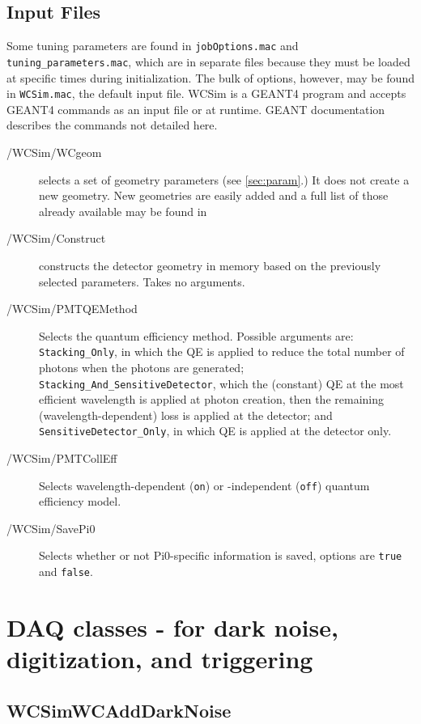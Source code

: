  

\subsection{Input Files}

Some tuning parameters are found in \texttt{jobOptions.mac} and \texttt{tuning\_parameters.mac}, which are in separate files because they must be loaded at specific times during initialization.  The bulk of options, however, may be found in \texttt{WCSim.mac}, the default input file.  WCSim is a GEANT4 program  and accepts GEANT4 commands as an input file or at runtime.  GEANT documentation describes the commands not detailed here.
\begin{description}
\item[/WCSim/WCgeom] selects a set of geometry parameters (see \ref{sec:param}.)  It does not create a new geometry. New geometries are easily added and a full list of those already available may be found in 
\item[/WCSim/Construct] constructs the detector geometry in memory based on the previously selected parameters.  Takes no arguments.
\item[/WCSim/PMTQEMethod] Selects the quantum efficiency method. Possible arguments are: \texttt{Stacking\_Only}, in which the QE is applied to reduce the total number of photons when the photons are generated; \texttt{Stacking\_And\_SensitiveDetector}, which the (constant) QE at the most efficient wavelength is applied at photon creation, then the remaining (wavelength-dependent) loss is applied at the detector; and \texttt{SensitiveDetector\_Only}, in which QE is applied at the detector only.
\item[/WCSim/PMTCollEff] Selects wavelength-dependent (\texttt{on}) or -independent (\texttt{off}) quantum efficiency model.
\item[/WCSim/SavePi0] Selects whether or not Pi0-specific information is saved, options are \texttt{true} and \texttt{false}.

\end{description}



\section{DAQ classes - for dark noise, digitization, and triggering}

\subsection{WCSimWCAddDarkNoise}
\label{sec:daq:darknoise}

